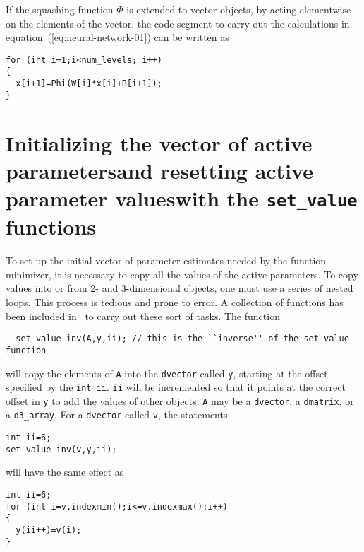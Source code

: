 \documentclass{admbmanual}
\begin{document}
If the squashing function $\Phi$ is
extended to vector objects, by acting elementwise on the elements
of the vector, the code segment to carry out the calculations in 
equation~(\ref{eq:neural-network-01}) %
can be written as
\begin{lstlisting}
for (int i=1;i<num_levels; i++)
{
  x[i+1]=Phi(W[i]*x[i]+B[i+1]);
}
\end{lstlisting}


\section{ Initializing the vector of active parameters\br and resetting
active parameter values\br with the \texttt{set\_value} functions}

To set up the initial vector of parameter estimates needed by the
function minimizer, it is necessary to copy all the values of the active
parameters. To copy values into or from 2- and 3-dimensional objects,
one must use a series of nested loops. This process is tedious and prone
to error. A collection of functions has been included in \scAD\ to
carry out these sort of tasks. The function 
\begin{lstlisting}
  set_value_inv(A,y,ii); // this is the ``inverse'' of the set_value function
\end{lstlisting} 
will copy the elements of \texttt{A} into the \texttt{dvector} called \texttt{y},
starting at the offset specified by the \texttt{int ii}. \texttt{ii}
will be incremented so that it points at the
correct offset in \texttt{y} to add the values of other objects.
\texttt{A} may be a \texttt{dvector}, a \texttt{dmatrix}, or a
\texttt{d3\_array}.
For a \texttt{dvector} called \texttt{v}, the statements
\begin{lstlisting}
int ii=6;
set_value_inv(v,y,ii);
\end{lstlisting}
will have the same effect as
\begin{lstlisting}
int ii=6;
for (int i=v.indexmin();i<=v.indexmax();i++)
{
  y(ii++)=v(i);
}
\end{lstlisting}
\end{document}
